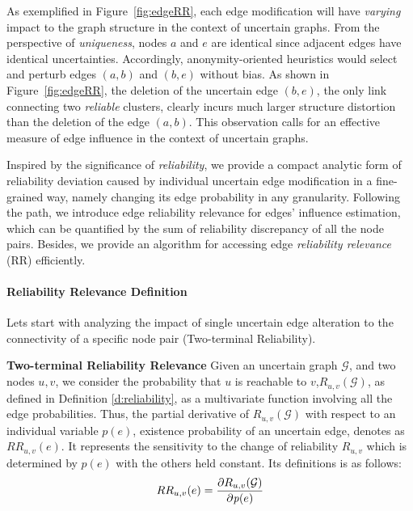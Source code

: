 As exemplified in Figure~\ref{fig:edgeRR}, each edge modification will have \emph{varying} impact to the graph structure in the context of uncertain graphs. From the perspective of \emph{uniqueness}, nodes $a$ and $e$ are identical since adjacent edges have identical uncertainties. Accordingly, anonymity-oriented heuristics would select and perturb edges $(a,b)$ and $(b,e)$ without bias. As shown in Figure~\ref{fig:edgeRR}, the deletion of the uncertain edge $(b,e)$, the only link connecting two \emph{reliable} clusters, clearly incurs much larger structure distortion than the deletion of the edge $(a,b)$. This observation calls for an effective measure of edge influence in the context of uncertain graphs. 

Inspired by the significance of \emph{reliability}, we provide a compact analytic form of reliability deviation caused by individual uncertain edge modification in a fine-grained way, namely changing its edge probability in any granularity. Following the path, we introduce edge reliability relevance for edges' influence estimation, which can be quantified by the sum of reliability discrepancy of all the node pairs. Besides, we provide an algorithm for accessing edge \emph{reliability relevance} (RR) efficiently. 

\paragraph{Reliability Relevance Definition}

Lets start with analyzing the impact of single uncertain edge alteration to the connectivity of a specific node pair (Two-terminal Reliability).  
\begin{definition}
    \textbf{Two-terminal Reliability Relevance}
    Given an uncertain graph $\mathcal{G}$, and two nodes $u,v$, we consider the probability that $u$ is reachable to $v$,$R_{u,v}(\mathcal{G})$, as defined in Definition \ref{d:reliability}, as a multivariate function involving all the edge probabilities.   
    Thus, the partial derivative of $R_{u,v}(\mathcal{G})$ with respect to an individual variable $p(e)$, existence probability of an uncertain edge, denotes as $RR_{u,v}(e)$. It represents the sensitivity to the change of reliability $R_{u,v}$ which is determined by $p(e)$ with the others held constant. Its definitions is as follows:  
\begin{equation*}
    \svj
    RR_{u,v}(e)= \frac{\partial R_{u,v}(\mathcal{G})}{\partial \mathit{p}(e)}
    \svj
\end{equation*}
\end{definition}

